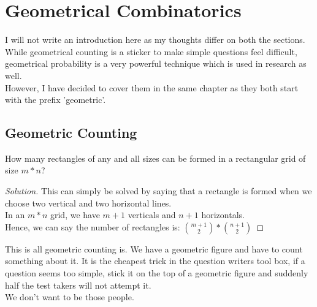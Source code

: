 \chapter{Geometrical Combinatorics}
I will not write an introduction here as my thoughts differ on both the sections.\\
While geometrical counting is a sticker to make simple questions feel difficult, geometrical probability is a very powerful technique which is used in research as well.\\
However, I have decided to cover them in the same chapter as they both start with the prefix 'geometric'.\\
\section{Geometric Counting}
\begin{example}
    How many rectangles of any and all sizes can be formed in a rectangular grid of size $m*n$?
\end{example}
\begin{proof}
    [Solution]
    This can simply be solved by saying that a rectangle is formed when we choose two vertical and two horizontal lines.\\
    In an $m*n$ grid, we have $m+1$ verticals and $n+1$ horizontals. \\
    Hence, we can say the number of rectangles is: $\binom{m+1}{2}*\binom{n+1}{2}$
\end{proof}
This is all geometric counting is. We have a geometric figure and have to count something about it. It is the cheapest trick in the question writers tool box, if a question seems too simple, stick it on the top of a geometric figure and suddenly half the test takers will not attempt it.\\
We don't want to be those people.\\

